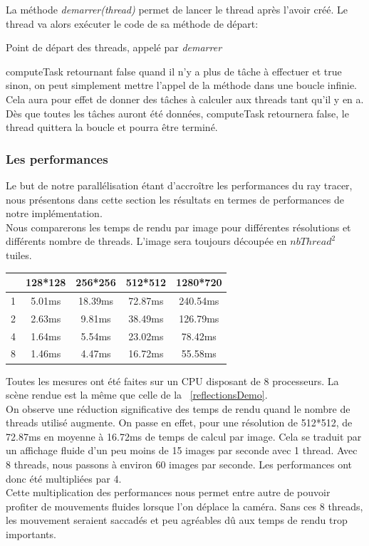 \documentclass[11pt]{article}
\begin{document}
La méthode \textit{demarrer(thread)} permet de lancer le thread après l'avoir créé. Le thread va alors exécuter le code de sa méthode de départ:

\begin{algorithm}[H]
	

	\caption{Point de départ des threads, appelé par \textit{demarrer}}
	\label{methodeDemarrer}
\end{algorithm}
computeTask retournant false quand il n'y a plus de tâche à effectuer et true sinon, on peut simplement mettre l'appel de la méthode dans une boucle infinie. Cela aura pour effet de donner des tâches à calculer aux threads tant qu'il y en a. Dès que toutes les tâches auront été données, computeTask retournera false, le thread quittera la boucle et pourra être terminé.

\subsubsection{Les performances}

Le but de notre parallélisation étant d'accroître les performances du ray tracer, nous présentons dans cette section les résultats en termes de performances de notre implémentation.\\
Nous comparerons les temps de rendu par image pour différentes résolutions et différents nombre de threads. L'image sera toujours découpée en $nbThread^2$ tuiles.

\begin{center}
	\begin{tabular}{|c|c|c|c|c|}
		\hline
		\backslashbox{Nombre de thread}{Résolution de rendu} & 128*128 & 256*256 & 512*512 & 1280*720\\
		\hline
		1 & 5.01ms & 18.39ms & 72.87ms & 240.54ms\\
		2 & 2.63ms & 9.81ms & 38.49ms & 126.79ms\\
		4 & 1.64ms & 5.54ms & 23.02ms & 78.42ms\\
		8 & 1.46ms & 4.47ms & 16.72ms & 55.58ms\\
		\hline
	\end{tabular}
\end{center}
Toutes les mesures ont été faites sur un CPU disposant de 8 processeurs. La scène rendue est la même que celle de la \figurename\ \ref{reflectionsDemo}.\\
On observe une réduction significative des temps de rendu quand le nombre de threads utilisé augmente. On passe en effet, pour une résolution de 512*512, de 72.87ms en moyenne à 16.72ms de temps de calcul par image. Cela se traduit par un affichage fluide d'un peu moins de 15 images par seconde avec 1 thread. Avec 8 threads, nous passons à environ 60 images par seconde. Les performances ont donc été multipliées par 4.\\
Cette multiplication des performances nous permet entre autre de pouvoir profiter de mouvements fluides lorsque l'on déplace la caméra. Sans ces 8 threads, les mouvement seraient saccadés et peu agréables dû aux temps de rendu trop importants.
\end{document}
